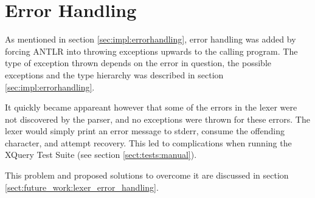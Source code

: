 \section{Error Handling}
\label{sect:error_handling:syntax_errors}
As mentioned in section \ref{sec:impl:errorhandling}, error handling was added
by forcing ANTLR into throwing exceptions upwards to the calling program. The
type of exception thrown depends on the error in question, the possible
exceptions and the type hierarchy was described in section
\ref{sec:impl:errorhandling}.

It quickly became appareant however that some of the errors in the lexer were
not discovered by the parser, and no exceptions were thrown for these errors. The
lexer would simply print an error message to stderr, consume the offending
character, and attempt recovery. This led to complications when running the
XQuery Test Suite (see section \ref{sect:tests:manual}).

This problem and proposed solutions to overcome it are discussed in section
\ref{sect:future_work:lexer_error_handling}.



